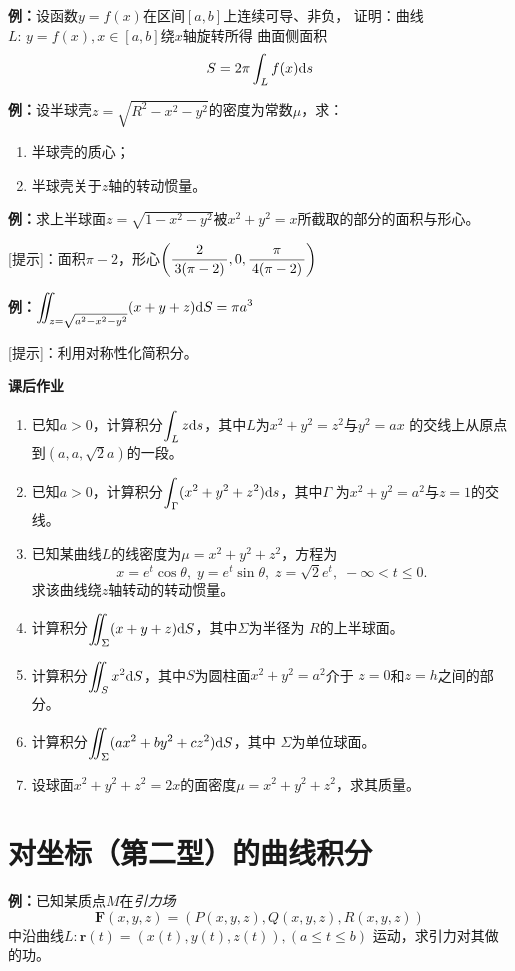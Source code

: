 {\bf 例：}设函数$y=f(x)$在区间$[a,b]$上连续可导、非负，
证明：曲线$L:\,y=f(x),x\in[a,b]$绕$x$轴旋转所得 曲面侧面积
$$S=2\pi\displaystyle\int_Lf(x)\mathrm{d} s$$

{\bf 例：}设半球壳$z=\sqrt{R^2-x^2-y^2}$的密度为常数$\mu$，求：
\begin{enumerate}[(1)]
  \setlength{\itemindent}{1cm}
  \item 半球壳的质心；
  \item 半球壳关于$z$轴的转动惯量。
\end{enumerate}

{\bf 例：}求上半球面$z=\sqrt{1-x^2-y^2}$被$x^2+y^2=x$所截取的部分的面积与形心。

[提示]：面积$\pi-2$，形心$\left(\displaystyle\frac{\,{2}\,}{\,{3(\pi-2)}\,},0,\displaystyle\frac{\,{\pi}\,}{\,{4(\pi-2)}\,}\right)$

{\bf 例：}$\displaystyle\iint_{z=\sqrt{a^2-x^2-y^2}}(x+y+z)\mathrm{d} S=\pi a^3$

[提示]：利用对称性化简积分。

\begin{ext}
	{\bf 课后作业}
	\begin{enumerate}
	  \item 已知$a>0$，计算积分$\displaystyle\int_L z\mathrm{d} s$，其中$L$为$x^2+y^2=z^2$与$y^2=ax$
	  的交线上从原点到$(a,a,\sqrt2a)$的一段。
	  \item 已知$a>0$，计算积分$\displaystyle\int_{\Gamma}(x^2+y^2+z^2)\mathrm{d} s$，其中$\Gamma$
	  为$x^2+y^2=a^2$与$z=1$的交线。
	  \item 已知某曲线$L$的线密度为$\mu=x^2+y^2+z^2$，方程为
	  $$x=e^t\cos\theta,\;y=e^t\sin\theta,\;z=\sqrt2e^t,\;-\infty<t\leq0.$$
	  求该曲线绕$z$轴转动的转动惯量。
	  \item 计算积分$\displaystyle\iint_{\Sigma}(x+y+z)\mathrm{d} S$，其中$\Sigma$为半径为
	  $R$的上半球面。
	  \item 计算积分$\displaystyle\iint_S x^2\mathrm{d} S$，其中$S$为圆柱面$x^2+y^2=a^2$介于
	  $z=0$和$z=h$之间的部分。
	  \item 计算积分$\displaystyle\iint_{\Sigma}(ax^2+by^2+cz^2)\mathrm{d} S$，其中
	  $\Sigma$为单位球面。
	  \item 设球面$x^2+y^2+z^2=2x$的面密度$\mu=x^2+y^2+z^2$，求其质量。
	\end{enumerate}
\end{ext}

\section{对坐标（第二型）的曲线积分}

{\bf 例：}已知某质点$M$在{\it 引力场}
$$\bm{F}(x,y,z)=(P(x,y,z),Q(x,y,z),R(x,y,z))$$
中沿曲线$L:\bm{r}(t)=(x(t),y(t),z(t)),(a\leq t\leq b)$
运动，求引力对其做的功。

